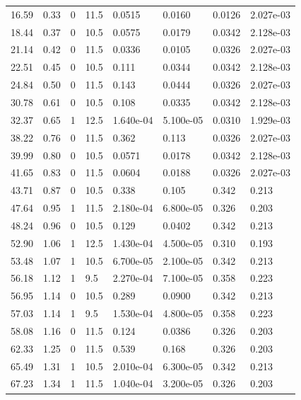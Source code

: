 \documentclass[preview]{standalone}
\begin{document}
{{\begin{tabular}{L{1.2cm}C{1.2cm} C{0.3cm}C{0.5cm} C{1.4cm}C{1.4cm} C{1.4cm}C{1.4cm}}
  16.59  &  0.33  & 0     & 11.5 &  0.0515  & 0.0160  & 0.0126 &  2.027e-03   \\ 
  18.44  &  0.37  & 0     & 10.5 &  0.0575  & 0.0179  & 0.0342 &  2.128e-03   \\ 
  21.14  &  0.42  & 0     & 11.5 &  0.0336  & 0.0105  & 0.0326 &  2.027e-03   \\ 
  22.51  &  0.45  & 0     & 10.5 &  0.111  & 0.0344  & 0.0342 &  2.128e-03   \\ 
  24.84  &  0.50  & 0     & 11.5 &  0.143  & 0.0444  & 0.0326 &  2.027e-03   \\ 
  30.78  &  0.61  & 0     & 10.5 &  0.108  & 0.0335  & 0.0342 &  2.128e-03   \\ 
  32.37  &  0.65  & 1     & 12.5 &  1.640e-04  & 5.100e-05  & 0.0310 &  1.929e-03   \\ 
  38.22  &  0.76  & 0     & 11.5 &  0.362  & 0.113  & 0.0326 &  2.027e-03   \\ 
  39.99  &  0.80  & 0     & 10.5 &  0.0571  & 0.0178  & 0.0342 &  2.128e-03   \\ 
  41.65  &  0.83  & 0     & 11.5 &  0.0604  & 0.0188  & 0.0326 &  2.027e-03   \\ 
  43.71  &  0.87  & 0     & 10.5 &  0.338  & 0.105  & 0.342 &  0.213   \\ 
  47.64  &  0.95  & 1     & 11.5 &  2.180e-04  & 6.800e-05  & 0.326 &  0.203   \\ 
  48.24  &  0.96  & 0     & 10.5 &  0.129  & 0.0402  & 0.342 &  0.213   \\ 
  52.90  &  1.06  & 1     & 12.5 &  1.430e-04  & 4.500e-05  & 0.310 &  0.193   \\ 
  53.48  &  1.07  & 1     & 10.5 &  6.700e-05  & 2.100e-05  & 0.342 &  0.213   \\ 
  56.18  &  1.12  & 1     & 9.5 &  2.270e-04  & 7.100e-05  & 0.358 &  0.223   \\ 
  56.95  &  1.14  & 0     & 10.5 &  0.289  & 0.0900  & 0.342 &  0.213   \\ 
  57.03  &  1.14  & 1     & 9.5 &  1.530e-04  & 4.800e-05  & 0.358 &  0.223   \\ 
  58.08  &  1.16  & 0     & 11.5 &  0.124  & 0.0386  & 0.326 &  0.203   \\ 
  62.33  &  1.25  & 0     & 11.5 &  0.539  & 0.168  & 0.326 &  0.203   \\ 
  65.49  &  1.31  & 1     & 10.5 &  2.010e-04  & 6.300e-05  & 0.342 &  0.213   \\ 
  67.23  &  1.34  & 1     & 11.5 &  1.040e-04  & 3.200e-05  & 0.326 &  0.203   \\ 

\end{tabular}}}
\end{document}

